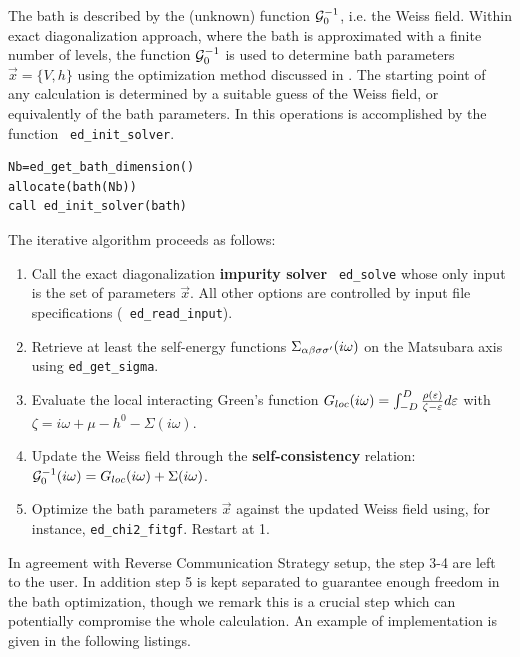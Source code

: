 The bath is described
by the (unknown) function ${\cal G}^{-1}_0$, i.e. the Weiss field. Within \NAME
exact diagonalization approach, where the bath is approximated with a
finite number of levels, the function ${\cal G}^{-1}_0$ is used to
determine bath parameters $\vec{x}=\{V,h\}$ using the optimization method discussed in
.
The starting point of any calculation is determined by a suitable
guess of the Weiss field, or equivalently of the bath parameters.
In \NAME this operations is accomplished by the function {\tt
  ed\_init\_solver}.

\begin{lstlisting}[style=fstyle,numbers=none,basicstyle={\scriptsize\ttfamily}]
Nb=ed_get_bath_dimension()
allocate(bath(Nb))
call ed_init_solver(bath)
\end{lstlisting}








The iterative algorithm proceeds as follows:
\begin{enumerate}
\item Call the exact diagonalization {\bf impurity solver} {\tt
    ed\_solve} whose only input is the set of parameters $\vec{x}$. All other
  options are controlled by input file specifications ({\tt
    ed\_read\_input}).
\item Retrieve at least the self-energy functions $\Sigma_{\alpha\beta\sigma\sigma'}(i\omega)$ on the
  Matsubara axis using {\tt ed\_get\_sigma}.
\item Evaluate the local interacting Green's function
  $G_{loc}(i\omega) = \int_{-D}^D \frac{\rho(\varepsilon)}{\zeta -\varepsilon}d\varepsilon$ with
  $\zeta=i\omega+\mu-h^0-\Sigma(i\omega)$.
  \item Update the Weiss field through the {\bf self-consistency}
    relation: ${\cal G}^{-1}_0(i\omega) = G_{loc}(i\omega) + \Sigma(i\omega)$. 
  \item Optimize the bath parameters $\vec{x}$ against the updated
    Weiss field using, for instance, {\tt ed\_chi2\_fitgf}. Restart at 1.
\end{enumerate}
In agreement with Reverse Communication Strategy setup, the step 3-4
are left to the user. In addition step 5 is kept separated to
guarantee enough freedom in the bath optimization, though we remark
this is a crucial step which can potentially compromise the whole
calculation.
An example of implementation is given in the following listings.

